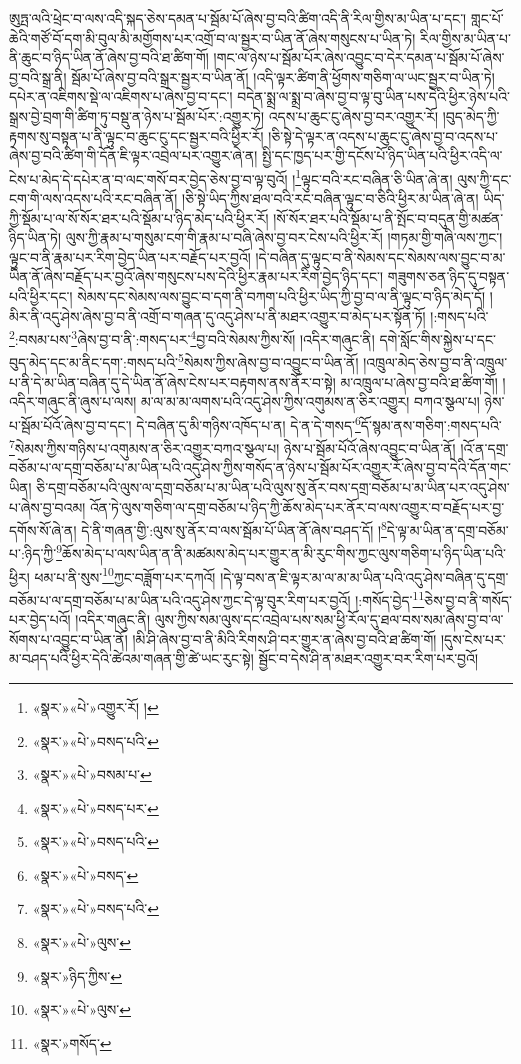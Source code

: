 ཨུཏྤ་ལའི་ཕྲེང་བ་ལས་འདི་སྐད་ཅེས་དམན་པ་སྦོམ་པོ་ཞེས་བྱ་བའི་ཚིག་འདི་ནི་རིལ་གྱིས་མ་ཡིན་པ་དང་། གླང་པོ་ཆེའི་གཙོ་བོ་དག་མི་བུལ་མི་མགྱོགས་པར་འགྲོ་བ་ལ་སྦྱར་བ་ཡིན་ནོ་ཞེས་གསུངས་པ་ཡིན་ཏེ། རིལ་གྱིས་མ་ཡིན་པ་ནི་ཆུང་བ་ཉིད་ཡིན་ནོ་ཞེས་བྱ་བའི་ཐ་ཚིག་གོ། །གང་ལ་ཉེས་པ་སྦོམ་པོར་ཞེས་འབྱུང་བ་དེར་དམན་པ་སྦོམ་པོ་ཞེས་བྱ་བའི་སྒྲ་ནི། སྦོམ་པོ་ཞེས་བྱ་བའི་སྒྲར་སྦྱར་བ་ཡིན་ནོ། །འདི་ལྟར་ཚིག་ནི་ཕྱོགས་གཅིག་ལ་ཡང་སྦྱར་བ་ཡིན་ཏེ། དཔེར་ན་འཇིགས་སྡེ་ལ་འཇིགས་པ་ཞེས་བྱ་བ་དང་། བདེན་སྨྲ་ལ་སྨྲ་བ་ཞེས་བྱ་བ་ལྟ་བུ་ཡིན་པས་དེའི་ཕྱིར་ཉེས་པའི་སྒྲས་བྱེ་བྲག་གི་ཚིག་ཏུ་བསྡུ་ན་ཉེས་པ་སྦོམ་པོར་:འགྱུར་ཏེ། འདས་པ་ཆུང་ངུ་ཞེས་བྱ་བར་འགྱུར་རོ། །བུད་མེད་ཀྱི་རྟགས་སུ་བསྟན་པ་ནི་ལྟུང་བ་ཆུང་ངུ་དང་སྦྱར་བའི་ཕྱིར་རོ། །ཅི་སྟེ་དེ་ལྟར་ན་འདས་པ་ཆུང་ངུ་ཞེས་བྱ་བ་འདས་པ་ཞེས་བྱ་བའི་ཚིག་གི་དོན་ཇི་ལྟར་འབྲེལ་པར་འགྱུར་ཞེ་ན། སྤྱི་དང་ཁྱད་པར་གྱི་དངོས་པོ་ཉིད་ཡིན་པའི་ཕྱིར་འདི་ལ་ངེས་པ་མེད་དེ་དཔེར་ན་བ་ལང་གསོ་བར་བྱེད་ཅེས་བྱ་བ་ལྟ་བུའོ། །\footnote{«སྣར་»«པེ་»འགྱུར་རོ། ། }ལྟུང་བའི་རང་བཞིན་ཅི་ཡིན་ཞེ་ན། ལུས་ཀྱི་དང་ངག་གི་ལས་འདས་པའི་རང་བཞིན་ནོ། །ཅི་སྟེ་ཡིད་ཀྱིས་ཐལ་བའི་རང་བཞིན་ལྟུང་བ་ཅིའི་ཕྱིར་མ་ཡིན་ཞེ་ན། ཡིད་ཀྱི་སྡོམ་པ་ལ་སོ་སོར་ཐར་པའི་སྡོམ་པ་ཉིད་མེད་པའི་ཕྱིར་རོ། །སོ་སོར་ཐར་པའི་སྡོམ་པ་ནི་སྤོང་བ་བདུན་གྱི་མཚན་ཉིད་ཡིན་ཏེ། ལུས་ཀྱི་རྣམ་པ་གསུམ་ངག་གི་རྣམ་པ་བཞི་ཞེས་བྱ་བར་ངེས་པའི་ཕྱིར་རོ། །གཏམ་གྱི་གཞི་ལས་ཀྱང་། ལྟུང་བ་ནི་རྣམ་པར་རིག་བྱེད་ཡིན་པར་བརྗོད་པར་བྱའོ། །དེ་བཞིན་དུ་ལྟུང་བ་ནི་སེམས་དང་སེམས་ལས་བྱུང་བ་མ་ཡིན་ནོ་ཞེས་བརྗོད་པར་བྱའོ་ཞེས་གསུངས་པས་དེའི་ཕྱིར་རྣམ་པར་རིག་བྱེད་ཉིད་དང་། གཟུགས་ཅན་ཉིད་དུ་བསྟན་པའི་ཕྱིར་དང་། སེམས་དང་སེམས་ལས་བྱུང་བ་དག་ནི་བཀག་པའི་ཕྱིར་ཡིད་ཀྱི་བྱ་བ་ལ་ནི་ལྟུང་བ་ཉིད་མེད་དོ། །མིར་ནི་འདུ་ཤེས་ཞེས་བྱ་བ་ནི་འགྲོ་བ་གཞན་དུ་འདུ་ཤེས་པ་ནི་མཐར་འགྱུར་བ་མེད་པར་སྟོན་ཏོ། །:གསད་པའི་\footnote{«སྣར་»«པེ་»བསད་པའི་}:བསམ་པས་\footnote{«སྣར་»«པེ་»བསམ་པ་}ཞེས་བྱ་བ་ནི་:གསད་པར་\footnote{«སྣར་»«པེ་»བསད་པར་}བྱ་བའི་སེམས་ཀྱིས་སོ། །འདིར་གཞུང་ནི། དགེ་སློང་གིས་སྐྱེས་པ་དང་བུད་མེད་དང་མ་ནིང་དག་:གསད་པའི་\footnote{«སྣར་»«པེ་»བསད་པའི་}སེམས་ཀྱིས་ཞེས་བྱ་བ་འབྱུང་བ་ཡིན་ནོ། །འཁྲུལ་མེད་ཅེས་བྱ་བ་ནི་འཁྲུལ་པ་ནི་དེ་མ་ཡིན་བཞིན་དུ་དེ་ཡིན་ནོ་ཞེས་ངེས་པར་བརྟགས་ནས་ནོར་བ་སྟེ། མ་འཁྲུལ་པ་ཞེས་བྱ་བའི་ཐ་ཚིག་གོ། །འདིར་གཞུང་ནི་ཞུས་པ་ལས། མ་ལ་མ་མ་ལགས་པའི་འདུ་ཤེས་ཀྱིས་འགུམས་ན་ཅིར་འགྱུར། བཀའ་སྩལ་པ། ཉེས་པ་སྦོམ་པོའོ་ཞེས་བྱ་བ་དང་། དེ་བཞིན་དུ་མི་གཉིས་འཁོད་པ་ན། དེ་ན་དེ་གསད་\footnote{«སྣར་»«པེ་»བསད་}དོ་སྙམ་ནས་གཅིག་:གསད་པའི་\footnote{«སྣར་»«པེ་»བསད་པའི་}སེམས་ཀྱིས་གཉིས་པ་འགུམས་ན་ཅིར་འགྱུར་བཀའ་སྩལ་པ། ཉེས་པ་སྦོམ་པོའོ་ཞེས་འབྱུང་བ་ཡིན་ནོ། །འོ་ན་དགྲ་བཅོམ་པ་ལ་དགྲ་བཅོམ་པ་མ་ཡིན་པའི་འདུ་ཤེས་ཀྱིས་གསོད་ན་ཉེས་པ་སྦོམ་པོར་འགྱུར་རོ་ཞེས་བྱ་བ་དེའི་དོན་གང་ཡིན། ཅི་དགྲ་བཅོམ་པའི་ལུས་ལ་དགྲ་བཅོམ་པ་མ་ཡིན་པའི་ལུས་སུ་ནོར་བས་དགྲ་བཅོམ་པ་མ་ཡིན་པར་འདུ་ཤེས་པ་ཞེས་བྱ་བའམ། འོན་ཏེ་ལུས་གཅིག་ལ་དགྲ་བཅོམ་པ་ཉིད་ཀྱི་ཆོས་མེད་པར་ནོར་བ་ལས་འགྱུར་བ་བརྗོད་པར་བྱ་དགོས་སོ་ཞེ་ན། དེ་ནི་གཞན་གྱི་:ལུས་སུ་ནོར་བ་ལས་སྦོམ་པོ་ཡིན་ནོ་ཞེས་བཤད་དོ། །\footnote{«སྣར་»«པེ་»ལུས་}དེ་ལྟ་མ་ཡིན་ན་དགྲ་བཅོམ་པ་:ཉིད་ཀྱི་\footnote{«སྣར་»ཉིད་ཀྱིས་}ཆོས་མེད་པ་ལས་ཡིན་ན་ནི་མཚམས་མེད་པར་གྱུར་ན་མི་རུང་གིས་ཀྱང་ལུས་གཅིག་པ་ཉིད་ཡིན་པའི་ཕྱིར། ཕམ་པ་ནི་སུས་\footnote{«སྣར་»«པེ་»ལུས་}ཀྱང་བཟློག་པར་དཀའོ། །དེ་ལྟ་བས་ན་ཇི་ལྟར་མ་ལ་མ་མ་ཡིན་པའི་འདུ་ཤེས་བཞིན་དུ་དགྲ་བཅོམ་པ་ལ་དགྲ་བཅོམ་པ་མ་ཡིན་པའི་འདུ་ཤེས་ཀྱང་དེ་ལྟ་བུར་རིག་པར་བྱའོ། །:གསོད་བྱེད་\footnote{«སྣར་»གསོད་}ཅེས་བྱ་བ་ནི་གསོད་པར་བྱེད་པའོ། །འདིར་གཞུང་ནི། ལུས་ཀྱིས་སམ་ལུས་དང་འབྲེལ་པས་སམ་ཕྱི་རོལ་དུ་ཐལ་བས་སམ་ཞེས་བྱ་བ་ལ་སོགས་པ་འབྱུང་བ་ཡིན་ནོ། །མི་ཤི་ཞེས་བྱ་བ་ནི་མིའི་རིགས་ཤི་བར་གྱུར་ན་ཞེས་བྱ་བའི་ཐ་ཚིག་གོ། །དུས་ངེས་པར་མ་བཤད་པའི་ཕྱིར་དེའི་ཚེའམ་གཞན་གྱི་ཚེ་ཡང་རུང་སྟེ། སྦྱོང་བ་དེས་ཤི་ན་མཐར་འགྱུར་བར་རིག་པར་བྱའོ། 